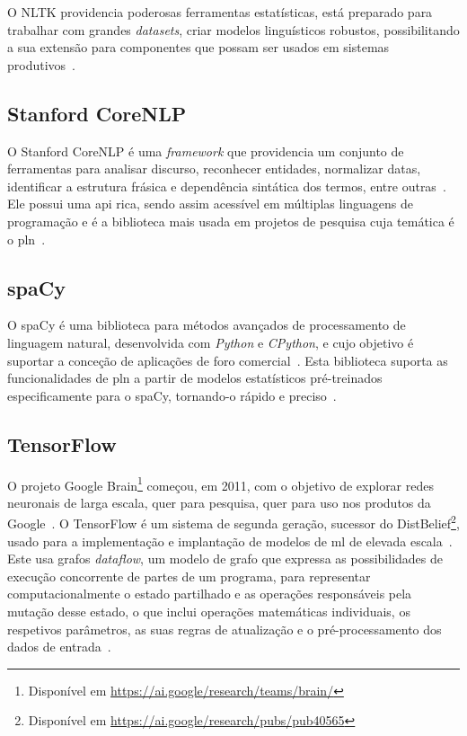 O NLTK providencia poderosas ferramentas estatísticas, está preparado para trabalhar com grandes \textit{datasets}, criar modelos linguísticos robustos, possibilitando a sua extensão para componentes que possam ser usados em sistemas produtivos~\parencite{nltk_education_scientific_purposes, applied_natural_language_processing_with_python}.

\subsection{Stanford CoreNLP}
O Stanford CoreNLP é uma \textit{framework} que providencia um conjunto de ferramentas para analisar discurso, reconhecer entidades, normalizar datas, identificar a estrutura frásica e dependência sintática dos termos, entre outras~\parencite{stanford_open_nlp}. Ele possui uma \gls{api} rica, sendo assim acessível em múltiplas linguagens de programação e é a biblioteca mais usada em projetos de pesquisa cuja temática é o \gls{pln}~\parencite{stanford_open_nlp, choosing_nlp_library}.

\subsection{spaCy}
O spaCy é uma biblioteca para métodos avançados de processamento de linguagem natural, desenvolvida com \textit{Python} e \textit{CPython}, e cujo objetivo é suportar a conceção de aplicações de foro comercial~\parencite{choosing_nlp_library}. Esta biblioteca suporta as funcionalidades de \gls{pln} a partir de modelos estatísticos pré-treinados especificamente para o spaCy, tornando-o rápido e preciso~\parencite{spacy_usage}.

\subsection{TensorFlow}
O projeto Google Brain\footnote{Disponível em \url{https://ai.google/research/teams/brain/}} começou, em 2011, com o objetivo de explorar redes neuronais de larga escala, quer para pesquisa, quer para uso nos produtos da Google~\parencite{tensorflow_largescale_machine_learning_distributed_systems}. O TensorFlow é um sistema de segunda geração, sucessor do DistBelief\footnote{Disponível em \url{https://ai.google/research/pubs/pub40565}}, usado para a implementação e implantação de modelos de \gls{ml} de elevada escala~\parencite{tensorflow_largescale_machine_learning_distributed_systems}. Este usa grafos \textit{dataflow}, um modelo de grafo que expressa as possibilidades de execução concorrente de partes de um programa, para representar computacionalmente o estado partilhado e as operações responsáveis pela mutação desse estado, o que inclui operações matemáticas individuais, os respetivos parâmetros, as suas regras de atualização e o pré-processamento dos dados de entrada~\parencite{data_flow_graphs_encyclopedia_parellel_computing, tensorflow_system_largescale_machine_learning}.

